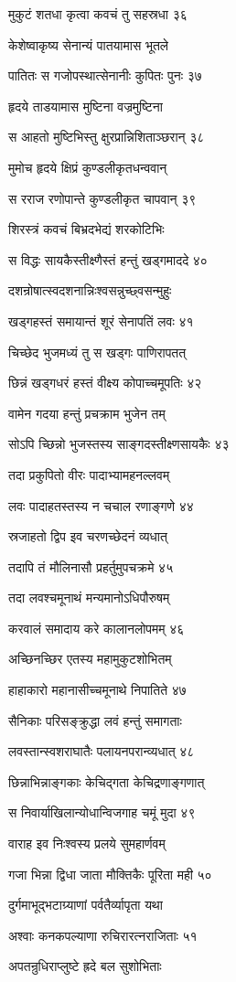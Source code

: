 मुकुटं शतधा कृत्वा कवचं तु सहस्रधा ३६

केशेष्वाकृष्य सेनान्यं पातयामास भूतले

पातितः स गजोपस्थात्सेनानीः कुपितः पुनः ३७

हृदये ताडयामास मुष्टिना वज्रमुष्टिना

स आहतो मुष्टिभिस्तु क्षुरप्रान्निशिताञ्छरान् ३८

मुमोच हृदये क्षिप्रं कुण्डलीकृतधन्ववान्

स रराज रणोपान्ते कुण्डलीकृत चापवान् ३९

शिरस्त्रं कवचं बिभ्रदभेद्यं शरकोटिभिः

स विद्धः सायकैस्तीक्ष्णैस्तं हन्तुं खड्गमाददे ४०

दशन्रोषात्स्वदशनान्निःश्वसन्नुच्छ्वसन्मुहुः

खड्गहस्तं समायान्तं शूरं सेनापतिं लवः ४१

चिच्छेद भुजमध्यं तु स खड्गः पाणिरापतत्

छिन्नं खड्गधरं हस्तं वीक्ष्य कोपाच्चमूपतिः ४२

वामेन गदया हन्तुं प्रचक्राम भुजेन तम्

सोऽपि च्छिन्नो भुजस्तस्य साङ्गदस्तीक्ष्णसायकैः ४३

तदा प्रकुपितो वीरः पादाभ्यामहनल्लवम्

लवः पादाहतस्तस्य न चचाल रणाङ्गणे ४४

स्रजाहतो द्विप इव चरणच्छेदनं व्यधात्

तदापि तं मौलिनासौ प्रहर्तुमुपचक्रमे ४५

तदा लवश्चमूनाथं मन्यमानोऽधिपौरुषम्

करवालं समादाय करे कालानलोपमम् ४६

अच्छिनच्छिर एतस्य महामुकुटशोभितम्

हाहाकारो महानासीच्चमूनाथे निपातिते ४७

सैनिकाः परिसङ्क्रुद्धा लवं हन्तुं समागताः

लवस्तान्स्वशराघातैः पलायनपरान्व्यधात् ४८

छिन्नाभिन्नाङ्गकाः केचिद्गता केचिद्रणाङ्गणात्

स निवार्याखिलान्योधान्विजगाह चमूं मुदा ४९

वाराह इव निःश्वस्य प्रलये सुमहार्णवम्

गजा भिन्ना द्विधा जाता मौक्तिकैः पूरिता मही ५०

दुर्गमाभूद्भटाग्र्याणां पर्वतैर्व्यापृता यथा

अश्वाः कनकपल्याणा रुचिरारत्नराजिताः ५१

अपतन्रुधिराप्लुष्टे ह्रदे बल सुशोभिताः

